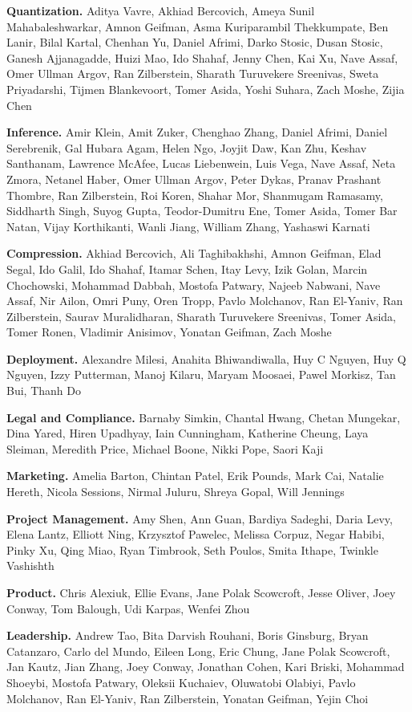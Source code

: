 \documentclass[11pt, logo, onecolumn, copyright, colorlinks=true, allcolors=blue]{nvidiatechreport}
\begin{document}
\textbf{Quantization.} Aditya Vavre, Akhiad Bercovich, Ameya Sunil Mahabaleshwarkar, Amnon Geifman, Asma Kuriparambil Thekkumpate, Ben Lanir, Bilal Kartal, Chenhan Yu, Daniel Afrimi, Darko Stosic, Dusan Stosic, Ganesh Ajjanagadde, Huizi Mao, Ido Shahaf, Jenny Chen, Kai Xu, Nave Assaf, Omer Ullman Argov, Ran Zilberstein, Sharath Turuvekere Sreenivas, Sweta Priyadarshi, Tijmen Blankevoort, Tomer Asida, Yoshi Suhara,  Zach Moshe, Zijia Chen

\textbf{Inference.} Amir Klein, Amit Zuker, Chenghao Zhang, Daniel Afrimi, Daniel Serebrenik, Gal Hubara Agam, Helen Ngo, Joyjit Daw, Kan Zhu, Keshav Santhanam, Lawrence McAfee, Lucas Liebenwein, Luis Vega, Nave Assaf, Neta Zmora, Netanel Haber, Omer Ullman Argov, Peter Dykas, Pranav Prashant Thombre, Ran Zilberstein, Roi Koren, Shahar Mor, Shanmugam Ramasamy, Siddharth Singh, Suyog Gupta, Teodor-Dumitru Ene, Tomer Asida, Tomer Bar Natan, Vijay Korthikanti, Wanli Jiang, William Zhang, Yashaswi Karnati

\textbf{Compression.} Akhiad Bercovich, Ali Taghibakhshi, Amnon Geifman, Elad Segal, Ido Galil, Ido Shahaf, Itamar Schen, Itay Levy, Izik Golan, Marcin Chochowski, Mohammad Dabbah, Mostofa Patwary, Najeeb Nabwani, Nave Assaf, Nir Ailon, Omri Puny, Oren Tropp, Pavlo Molchanov, Ran El-Yaniv, Ran Zilberstein, Saurav Muralidharan, Sharath Turuvekere Sreenivas, Tomer Asida, Tomer Ronen, Vladimir Anisimov, Yonatan Geifman, Zach Moshe

\textbf{Deployment.} Alexandre Milesi, Anahita Bhiwandiwalla, Huy C Nguyen, Huy Q Nguyen, Izzy Putterman, Manoj Kilaru, Maryam Moosaei, Pawel Morkisz, Tan Bui, Thanh Do

\textbf{Legal and Compliance.} Barnaby Simkin, Chantal Hwang, Chetan Mungekar, Dina Yared, Hiren Upadhyay, Iain Cunningham, Katherine Cheung, Laya Sleiman, Meredith Price, Michael Boone, Nikki Pope, Saori Kaji

\textbf{Marketing.} Amelia Barton, Chintan Patel, Erik Pounds, Mark Cai, Natalie Hereth, Nicola Sessions, Nirmal Juluru, Shreya Gopal, Will Jennings

\textbf{Project Management.} Amy Shen, Ann Guan, Bardiya Sadeghi, Daria Levy, Elena Lantz, Elliott Ning, Krzysztof Pawelec, Melissa Corpuz, Negar Habibi, Pinky Xu, Qing Miao, Ryan Timbrook, Seth Poulos, Smita Ithape, Twinkle Vashishth

\textbf{Product.}  Chris Alexiuk, Ellie Evans, Jane Polak Scowcroft, Jesse Oliver, Joey Conway, Tom Balough, Udi Karpas, Wenfei Zhou

\textbf{Leadership.} Andrew Tao, Bita Darvish Rouhani, Boris Ginsburg, Bryan Catanzaro, Carlo del Mundo, Eileen Long, Eric Chung, Jane Polak Scowcroft, Jan Kautz, Jian Zhang, Joey Conway, Jonathan Cohen, Kari Briski, Mohammad Shoeybi, Mostofa Patwary, Oleksii Kuchaiev, Oluwatobi Olabiyi, Pavlo Molchanov, Ran El-Yaniv, Ran Zilberstein, Yonatan Geifman, Yejin Choi

\newpage



\end{document}
